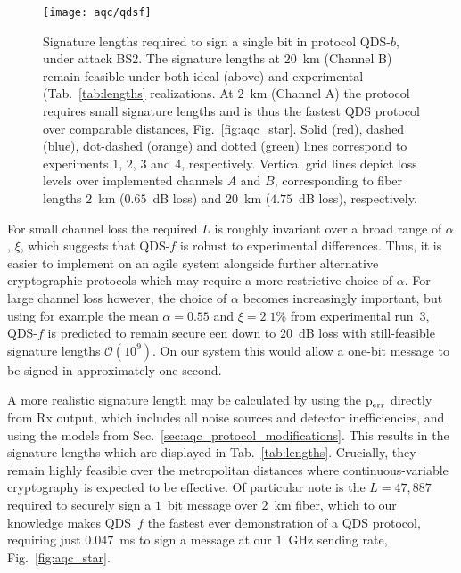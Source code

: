 \begin{figure}[htp]
\captionsetup{width=0.8\linewidth}
\centering
\texttt{[image: aqc/qdsf]}
\caption{\label{fig:aqc_qdsf} Signature lengths required to sign a single bit in protocol QDS-$b$, under attack BS$2$. The signature lengths at $20$~km (Channel B) remain feasible under both ideal (above) and experimental (Tab.~\ref{tab:lengths} realizations. At $2$~km (Channel A) the protocol requires small signature lengths and is thus the fastest QDS protocol over comparable distances, Fig.~\ref{fig:aqc_star}. Solid (red), dashed (blue), dot-dashed (orange) and dotted (green) lines correspond to experiments $1$, $2$, $3$ and $4$, respectively. Vertical grid lines depict loss levels over implemented channels $A$ and $B$, corresponding to fiber lengths $2$~km ($0.65$~dB loss) and $20$~km ($4.75$~dB loss), respectively.}
\end{figure}

For small channel loss the required $L$ is roughly invariant over a broad range of $\alpha$, $\xi$, which suggests that QDS-$f$ is robust to experimental differences. Thus, it is easier to implement on an agile system alongside further alternative cryptographic protocols which may require a more restrictive choice of $\alpha$. For large channel loss however, the choice of $\alpha$ becomes increasingly important, but using for example the mean $\alpha = 0.55$ and $\xi = 2.1\%$ from experimental run~$3$, QDS-$f$ is predicted to remain secure een down to $20$~dB loss with still-feasible signature lengths $\mathcal{O}\left(10^9\right)$. On our system this would allow a one-bit message to be signed in approximately one second.

A more realistic signature length may be calculated by using the $\text{p}_{\text{err}}$ directly from Rx output, which includes all noise sources and detector inefficiencies, and using the models from Sec.~\ref{sec:aqc_protocol_modifications}. This results in the signature lengths which are displayed in Tab.~\ref{tab:lengths}. Crucially, they remain highly feasible over the metropolitan distances where continuous-variable cryptography is expected to be effective. Of particular note is the $L = 47,887$ required to securely sign a $1$~bit message over $2$~km fiber, which to our knowledge makes QDS~$f$ the fastest ever demonstration of a QDS protocol, requiring just $0.047$~ms to sign a message at our $1$~GHz sending rate, Fig.~\ref{fig:aqc_star}.


